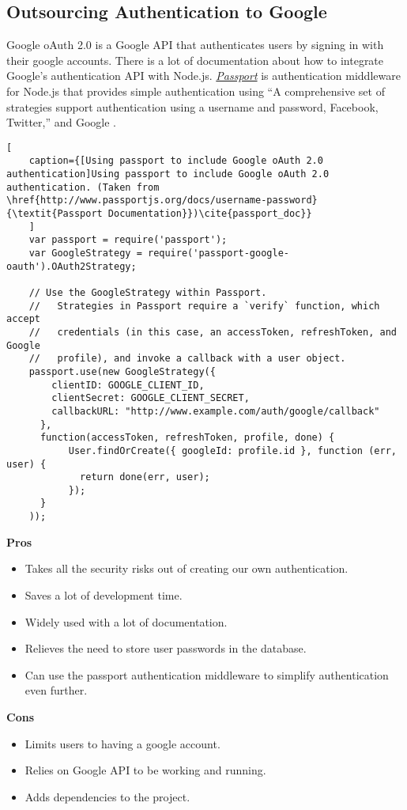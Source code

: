 \documentclass[onecolumn, draftclsnofoot,10pt, compsoc]{IEEEtran}
\begin{document}
\subsection{Outsourcing Authentication to Google}
Google oAuth 2.0 is a Google API that authenticates users by signing in with their google accounts. There is a lot of documentation about how to integrate Google's authentication API with Node.js. \href{http://www.passportjs.org/}{\textit{Passport}} is authentication middleware for Node.js that provides simple authentication using ``A comprehensive set of strategies support authentication using a username and password, Facebook, Twitter,'' and Google \cite{passport}.
\begin{lstlisting}[
    caption={[Using passport to include Google oAuth 2.0 authentication]Using passport to include Google oAuth 2.0 authentication. (Taken from \href{http://www.passportjs.org/docs/username-password}{\textit{Passport Documentation}})\cite{passport_doc}}
    ]
    var passport = require('passport');
    var GoogleStrategy = require('passport-google-oauth').OAuth2Strategy;
    
    // Use the GoogleStrategy within Passport.
    //   Strategies in Passport require a `verify` function, which accept
    //   credentials (in this case, an accessToken, refreshToken, and Google
    //   profile), and invoke a callback with a user object.
    passport.use(new GoogleStrategy({
        clientID: GOOGLE_CLIENT_ID,
        clientSecret: GOOGLE_CLIENT_SECRET,
        callbackURL: "http://www.example.com/auth/google/callback"
      },
      function(accessToken, refreshToken, profile, done) {
           User.findOrCreate({ googleId: profile.id }, function (err, user) {
             return done(err, user);
           });
      }
    ));
\end{lstlisting}
\textbf{Pros}
\begin{itemize}
    \item Takes all the security risks out of creating our own authentication.
    \item Saves a lot of development time. 
    \item Widely used with a lot of documentation.
    \item Relieves the need to store user passwords in the database.
    \item Can use the passport authentication middleware to simplify authentication even further.
\end{itemize}
\textbf{Cons} 
\begin{itemize}
    \item Limits users to having a google account.
    \item Relies on Google API to be working and running.
    \item Adds dependencies to the project.
\end{itemize}
\end{document}

